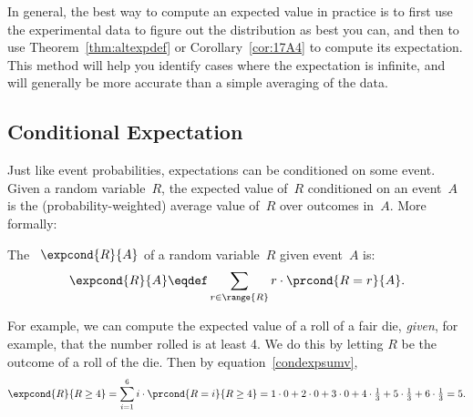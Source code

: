 In general, the best way to compute an expected value in practice is
to first use the experimental data to figure out the distribution as
best you can, and then to use Theorem~\ref{thm:altexpdef} or
Corollary~\ref{cor:17A4} to compute its expectation.  This method will
help you identify cases where the expectation is infinite, and will
generally be more accurate than a simple averaging of the data.

\subsection{Conditional Expectation}

Just like event probabilities, expectations can be conditioned on some
event.  Given a random variable~$R$, the expected value of~$R$
conditioned on an event~$A$ is the (probability-weighted) average
value of~$R$ over outcomes in~$A$.  More formally:
\begin{definition}\label{condexpdef}
The ~$\expcond{R}{A}$ of a random
variable~$R$ given event~$A$ is:
\begin{equation}\label{condexpsumv}
\expcond{R}{A} \eqdef \sum_{r \in \range{R}} r \cdot\prcond{R=r}{A}.
\end{equation}
\end{definition}

For example, we can compute the expected value of a roll of a fair die,
\emph{given}, for example, that the number rolled is at least 4.  We do
this by letting $R$ be the outcome of a roll of the die.  Then
by equation~\eqref{condexpsumv},
\[
\expcond{R}{R \geq 4} = \sum_{i=1}^6 i \cdot \prcond{R=i}{R \ge 4}
= 1\cdot 0 + 2\cdot 0 + 3\cdot 0 +
  4\cdot\tfrac{1}{3} + 5\cdot\tfrac{1}{3} + 6\cdot\tfrac{1}{3}
= 5.
\]

